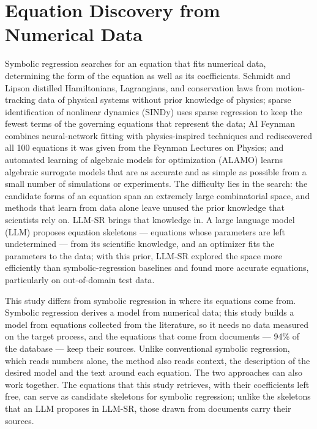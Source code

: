 \section{Equation Discovery from Numerical Data}
\label{sec:rw-sr}

Symbolic regression searches for an equation that fits numerical data, determining the form of the
equation as well as its coefficients\cite{AIFeynman}. Schmidt and Lipson distilled Hamiltonians,
Lagrangians, and conservation laws from motion-tracking data of physical systems without prior
knowledge of physics\cite{SchmidtLipson}; sparse identification of nonlinear dynamics (SINDy)
uses sparse regression to keep the fewest terms of the governing equations that represent the
data\cite{SINDy}; AI Feynman combines neural-network fitting with physics-inspired techniques and
rediscovered all 100 equations it was given from the Feynman Lectures on Physics\cite{AIFeynman};
and automated learning of algebraic models for optimization (ALAMO) learns algebraic surrogate
models that are as accurate and as simple as possible from a small number of simulations or
experiments\cite{ALAMO}. The difficulty lies in the search: the candidate forms of an equation
span an extremely large combinatorial space, and methods that learn from data alone leave unused
the prior knowledge that scientists rely on\cite{LLMSR}. LLM-SR brings that knowledge in. A large
language model (LLM) proposes equation skeletons --- equations whose parameters are left
undetermined --- from its scientific knowledge, and an optimizer fits the parameters to the data;
with this prior, LLM-SR explored the space more efficiently than symbolic-regression baselines and
found more accurate equations, particularly on out-of-domain test data\cite{LLMSR}.

This study differs from symbolic regression in where its equations come from. Symbolic regression
derives a model from numerical data; this study builds a model from equations collected from the
literature, so it needs no data measured on the target process, and the equations that come from
documents --- 94\% of the database --- keep their sources. Unlike conventional symbolic regression,
which reads numbers alone, the method also reads context, the description of the desired model and
the text around each equation. The two approaches can also work together. The equations that this
study retrieves, with their coefficients left free, can serve as candidate skeletons for symbolic
regression; unlike the skeletons that an LLM proposes in LLM-SR, those drawn from documents carry
their sources.

